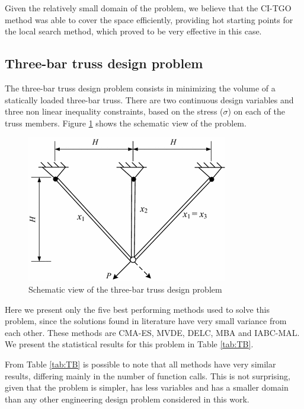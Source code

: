 Given the relatively small domain of the problem, we believe that the CI-TGO method was able to cover the space efficiently, providing hot starting points for the local search method, which proved to be very effective in this case.




\subsection{Three-bar truss design problem}

The three-bar truss design problem \citep{TB} consists in minimizing the volume of a statically loaded three-bar truss. There are two continuous design variables and three non linear inequality constraints, based on the stress ($\sigma$) on each of the truss members. Figure \ref{fig:TB} shows the schematic view of the problem.

\begin{figure}[h]
\begin{center}
\includegraphics[scale=0.5]{Imgs/TB.png}
\end{center}
\captionsetup{justification=centering}
\caption{Schematic view of the three-bar truss design problem}\label{fig:TB}
\end{figure}


Here we present only the five best performing methods used to solve this problem, since the solutions found in literature have very small variance from each other. These methods are CMA-ES, MVDE, DELC, MBA and IABC-MAL. We present the statistical results for this problem in Table \ref{tab:TB}.



From Table \ref{tab:TB} is possible to note that all methods have very similar results, differing mainly in the number of function calls. This is not surprising, given that the problem is simpler, has less variables and has a smaller domain than any other engineering design problem considered in this work.

